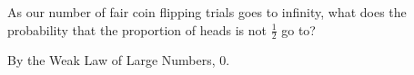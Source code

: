 \question As our number of fair coin flipping trials goes to infinity, what does the probability that the proportion of heads is not $\frac{1}{2}$ go to? 

\begin{solution}
	By the Weak Law of Large Numbers, 0. 
\end{solution}